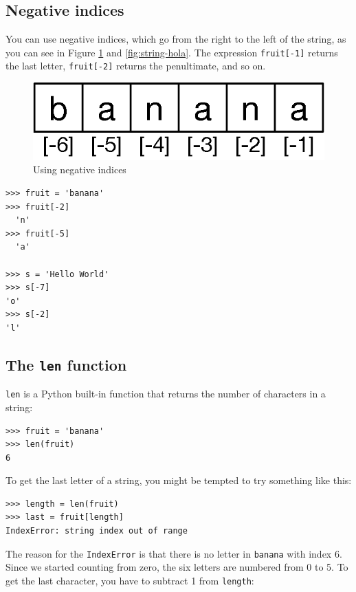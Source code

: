 \subsection{Negative indices}

You can use negative indices, which go from the right to the left of the string, as you can see in Figure \ref{fig:string-negativa} and \ref{fig:string-hola}. The expression \texttt{fruit[-1]} returns the last letter, \texttt{fruit[-2]} returns the penultimate, and so on.

\begin{figure}[h]
    \centering
    \includegraphics{images/string-negatief}
    \caption{Using negative indices}
    \label{fig:string-negativa}
\end{figure}


\begin{Verbatim}[frame=single]
>>> fruit = 'banana'
>>> fruit[-2]
  'n'
>>> fruit[-5]
  'a'
  
>>> s = 'Hello World'
>>> s[-7]
'o'
>>> s[-2]
'l'
\end{Verbatim}


\subsection{The \texttt{len} function}

\texttt{len} is a Python built-in function that returns the number of characters in a string:

\begin{Verbatim}[frame=single]
>>> fruit = 'banana'
>>> len(fruit)
6
\end{Verbatim}
%
To get the last letter of a string, you might be tempted to try something like this:

\begin{Verbatim}[frame=single]
>>> length = len(fruit)
>>> last = fruit[length]
IndexError: string index out of range
\end{Verbatim}
%
The reason for the \texttt{IndexError} is that there is no letter in \texttt{banana} with index 6. Since we started counting from zero, the six letters are numbered from 0 to 5. To get the last character, you have
to subtract 1 from \texttt{length}:

